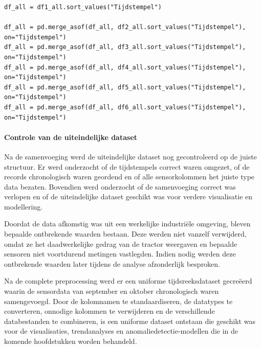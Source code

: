 \begin{listing}[H]
\begin{verbatim}
df_all = df1_all.sort_values("Tijdstempel")   
    
df_all = pd.merge_asof(df_all, df2_all.sort_values("Tijdstempel"), on="Tijdstempel")
df_all = pd.merge_asof(df_all, df3_all.sort_values("Tijdstempel"), on="Tijdstempel")
df_all = pd.merge_asof(df_all, df4_all.sort_values("Tijdstempel"), on="Tijdstempel")
df_all = pd.merge_asof(df_all, df5_all.sort_values("Tijdstempel"), on="Tijdstempel")
df_all = pd.merge_asof(df_all, df6_all.sort_values("Tijdstempel"), on="Tijdstempel")
\end{verbatim}
\caption[Code snippet: samenvoegen uiteindelijke tractordataset]{Regels code om de datasets samen te voegen tot de uiteindelijke tractordataset.}
\end{listing}

\paragraph{Controle van de uiteindelijke dataset}

Na de samenvoeging werd de uiteindelijke dataset nog gecontroleerd op de juiste structuur. Er werd onderzocht of de tijdstempels correct waren omgezet, of de records chronologisch waren geordend en of alle sensorkolommen het juiste type data bezaten. Bovendien werd onderzocht of de samenvoeging correct was verlopen en of de uiteindelijke dataset geschikt was voor verdere visualisatie en modellering.

Doordat de data afkomstig was uit een werkelijke industriële omgeving, bleven bepaalde ontbrekende waarden bestaan. Deze werden niet vanzelf verwijderd, omdat ze het daadwerkelijke gedrag van de tractor weergaven en bepaalde sensoren niet voortdurend metingen vastlegden. Indien nodig werden deze ontbrekende waarden later tijdens de analyse afzonderlijk besproken.

Na de complete preprocessing werd er een uniforme tijdsreeksdataset gecreëerd waarin de sensordata van september en oktober chronologisch waren samengevoegd. Door de kolomnamen te standaardiseren, de datatypes te converteren, onnodige kolommen te verwijderen en de verschillende databestanden te combineren, is een uniforme dataset ontstaan die geschikt was voor de visualisaties, trendanalyses en anomaliedetectie-modellen die in de komende hoofdstukken worden behandeld.


